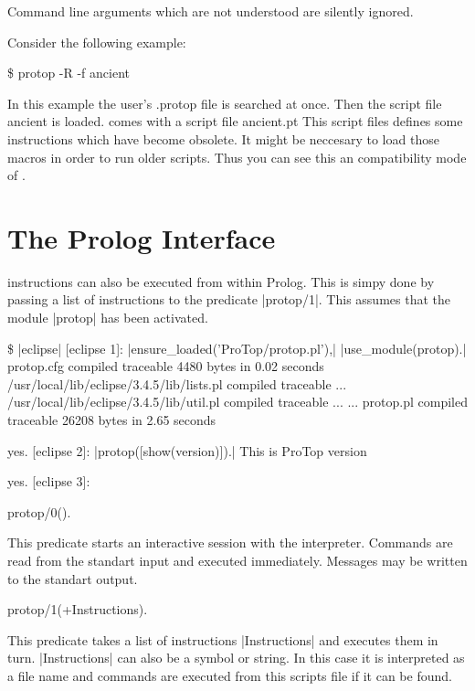 Command line arguments which are not understood are silently ignored.

Consider the following example:

\begin{BoxedSample}
  \$ protop -R -f ancient
\end{BoxedSample}

In this example the user's {\sf .protop} file is searched at once. Then the
script file ancient is loaded. \ProTop{} comes with a script file {\sf
  ancient.pt} This script files defines some instructions which have become
obsolete. It might be neccesary to load those macros in order to run older
scripts. Thus you can see this an compatibility mode of \ProTop.




\section{The Prolog Interface}\label{ProTop:prolog.interface}

\ProTop{} instructions can also be executed from within Prolog. This is simpy
done by passing a list of instructions to the predicate |protop/1|. This
assumes that the module |protop| has been activated.
%
\begin{BoxedSample}\raggedright
\$ |eclipse|
[eclipse 1]: |ensure_loaded('ProTop/protop.pl'),|
             |use_module(protop).|
protop.cfg compiled traceable 4480 bytes in 0.02 seconds
/usr/local/lib/eclipse/3.4.5/lib/lists.pl compiled traceable ...
/usr/local/lib/eclipse/3.4.5/lib/util.pl compiled traceable ...
...
protop.pl  compiled traceable 26208 bytes in 2.65 seconds

yes.
[eclipse 2]: |protop([show(version)]).|
        This is ProTop version \Version

yes.
[eclipse 3]: 
\end{BoxedSample}

\def\PrologFILE{protop}

\Predicate protop/0().

This predicate starts an interactive session with the \ProTop{} interpreter.
Commands are read from the standart input and executed immediately. Messages
may be written to the standart output.

\Predicate protop/1(+Instructions).

This predicate takes a list of \ProTop{} instructions |Instructions| and
executes them in turn. |Instructions| can also be a symbol or string. In this
case it is interpreted as a file name and commands are executed from this
scripts file if it can be found.

